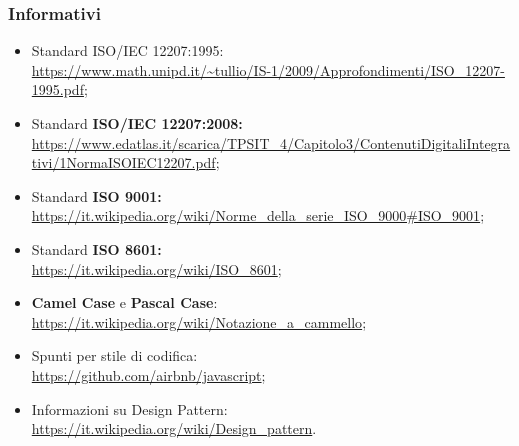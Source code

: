 \subsubsection{Informativi}
\begin{itemize}
\item Standard ISO/IEC 12207:1995:\\ \url{https://www.math.unipd.it/~tullio/IS-1/2009/Approfondimenti/ISO_12207-1995.pdf};
\item Standard \textbf{ISO/IEC 12207:2008: }\\ \url{https://www.edatlas.it/scarica/TPSIT_4/Capitolo3/ContenutiDigitaliIntegrativi/1NormaISOIEC12207.pdf};
\item Standard \textbf{ISO 9001: }\\ \url{https://it.wikipedia.org/wiki/Norme_della_serie_ISO_9000#ISO_9001};
\item Standard \textbf{ISO 8601: }\\ \url{https://it.wikipedia.org/wiki/ISO_8601};
\item \textbf{Camel Case} e \textbf{Pascal Case}:\\ \url{https://it.wikipedia.org/wiki/Notazione_a_cammello};
\item Spunti per stile di codifica:\\ \url{https://github.com/airbnb/javascript};
\item Informazioni su Design Pattern:\\ \url{https://it.wikipedia.org/wiki/Design_pattern}.
\end{itemize}
